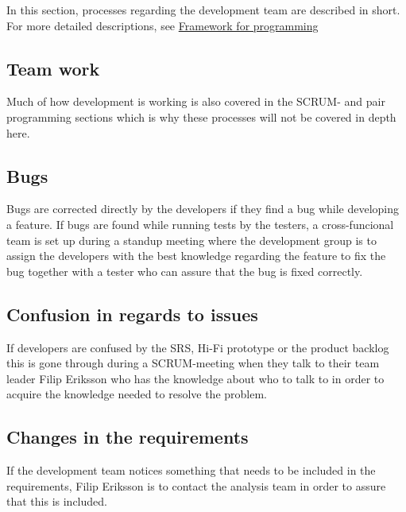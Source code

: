 In this section, processes regarding the development team are described in short. For more detailed descriptions, see \href{https://teams.microsoft.com/l/file/615C62C2-B9BB-4CBA-BEA8-7DE9C1A7FAC5?tenantId=913f18ec-7f26-4c5f-a816-784fe9a58edd&fileType=docx&objectUrl=https%3A%2F%2Fliuonline.sharepoint.com%2Fsites%2FTeam_TDDC88_2020_C3%2FDelade%20dokument%2FGeneral%2FDevelopment%2FFramework%20for%20programming%20TDDC88.docx&baseUrl=https%3A%2F%2Fliuonline.sharepoint.com%2Fsites%2FTeam_TDDC88_2020_C3&serviceName=teams&threadId=19:2e5b2f7b1d9c4b17a70ddd8351b41898@thread.tacv2&groupId=ddbf5407-892d-41b3-96fe-b65d1bfad5b2}{Framework for programming}
\subsection{Team work}
Much of how development is working is also covered in the SCRUM- and pair programming sections which is why these processes will not be covered in depth here. 
\subsection{Bugs}
Bugs are corrected directly by the developers if they find a bug while developing a feature. If bugs are found while running tests by the testers, a cross-funcional team is set up during a standup meeting where the development group is to assign the developers with the best knowledge regarding the feature to fix the bug together with a tester who can assure that the bug is fixed correctly. 
\subsection{Confusion in regards to issues}
If developers are confused by the SRS, Hi-Fi prototype or the product backlog this is gone through during a SCRUM-meeting when they talk to their team leader Filip Eriksson who has the knowledge about who to talk to in order to acquire the knowledge needed to resolve the problem. 
\subsection{Changes in the requirements}
If the development team notices something that needs to be included in the requirements, Filip Eriksson is to contact the analysis team in order to assure that this is included. 
